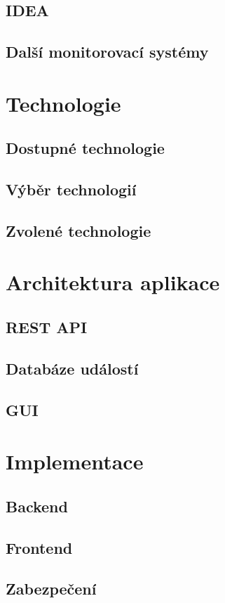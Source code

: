 \section{IDEA}
\label{sec:idea}

\section{Další monitorovací systémy}

\chapter{Technologie}
\section{Dostupné technologie}
\section{Výběr technologií}
\section{Zvolené technologie}

\chapter{Architektura aplikace}
\section{REST API}
\section{Databáze událostí}
\section{GUI}

\chapter{Implementace}
\section{Backend}
\section{Frontend}
\section{Zabezpečení}
